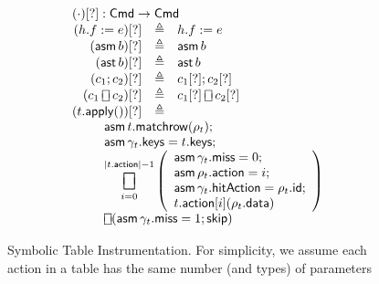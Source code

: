 \documentclass{article}
\newcommand{\Cmd}{\mathsf{Cmd}}
\newcommand{\action}{\mathsf{action}}
\newcommand{\keys}{\mathsf{keys}}
\newcommand{\data}{\mathsf{data}}
\newcommand{\id}{\mathsf{id}}
\newcommand{\hitAction}{\mathsf{hitAction}}
\newcommand{\miss}{\mathsf{miss}}
\newcommand{\assert}{\mathop{\mathsf{ast}}}
\newcommand{\assume}{\mathop{\mathsf{asm}}}
\newcommand{\apply}{\mathsf{apply}}
\newcommand{\choiceop}{\rotatebox[origin=c]{90}{$\sqsubset\!\!\!\sqsupset$}}
\newcommand{\choice}{\mathbin{\choiceop}}
\DeclareMathOperator*{\bigchoice}{\scalerel*{\choiceop}{\sum}}
\newcommand{\SKIP}{\mathsf{skip}}
\newcommand{\instr}{[?]}
\newcommand{\matchrow}{\mathsf{matchrow}}
\theoremstyle{plain}
\theoremstyle{definition}
\theoremstyle{remark}
\begin{document}
\begin{figure}[htp]
\[\begin{array}{r >{\triangleq}cl}
  \multicolumn{3}{l}{(\cdot)\instr : \Cmd \to \Cmd} \\
  (h.f := e)\instr && h.f := e \\
  (\assume b)\instr && \assume b \\
  (\assert b)\instr && \assert b\\
  (c_1;c_2)\instr && c_1\instr;c_2\instr\\
  (c_1 \choice c_2)\instr && c_1\instr \choice c_2\instr\\
  (t.\apply())\instr &&\\
  \multicolumn{3}{l}{
    \qquad
    \begin{array}[t]{l} \displaystyle
      \assume t.\matchrow(\rho_t); \\
      \assume \gamma_t.\keys = t.\keys; \\
    \displaystyle \bigchoice_{i=0}^{|t.\action| -1}
    \left(\begin{array}{l}
      \assume \gamma_t.\miss = 0;\\
      \assume \rho_t.\action = i;\\
      \assume \gamma_t.\hitAction = \rho_t.\id;\\
      t.\action[i](\rho_t.\data)
    \end{array}\right)\\
    \choice (\assume \gamma_t.\miss = 1; \SKIP)  \\
  \end{array}}
  \end{array}
  \]
  \caption{Symbolic Table Instrumentation. For simplicity, we
    assume each action in a table has the same number (and types) of parameters}
  \label{fig:table-instrument}
\end{figure}
\end{document}
